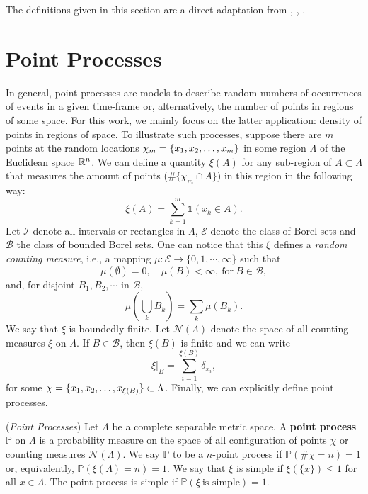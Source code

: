 The definitions given in this section are a direct adaptation from \cite{JOHANSSON20061}, \cite{SERFOZO19901}, \cite{ManuelaGirottiPhD}. 

\section{Point Processes}

 In general, point processes are models to describe random numbers of occurrences of events in a given time-frame or, alternatively, the number of points in regions of some space. For this work, we mainly focus on the latter application: density of points in regions of space. To illustrate such processes, suppose there are $m$ points at the random locations $\chi_m = \{x_1, x_2, \dots, x_m\}$ in some region $\Lambda$ of the Euclidean space $\mathbb{R}^n$. We can define a quantity $\xi(A)$ for any sub-region of $A \subset \Lambda$ that measures the amount of points ($\#\{\chi_m \cap A\}$) in this region in the following way:
\begin{equation}
	\xi(A) = \sum_{k=1}^{m} \mathbb{1}(x_k \in A).
\end{equation}
Let $\mathcal{I}$ denote all intervals or rectangles in $\Lambda$, $\mathcal{E}$ denote the class of Borel sets and $\mathcal{B}$ the class of bounded Borel sets. One can notice that this $\xi$ defines a \textit{random counting measure}, i.e., a mapping $\mu: \mathcal{E} \rightarrow \{0,1,\cdots, \infty\}$ such that 
\begin{equation}
	\mu(\emptyset) = 0, \quad \mu(B) < \infty, \ \text{for} \ B \in \mathcal{B},
\end{equation} 
and, for disjoint $B_1, B_2, \cdots$ in $\mathcal{B},$
\begin{equation}
	\mu\left( \bigcup_k B_k \right) = \sum_k \mu(B_k).
\end{equation} 
We say that $\xi$ is boundedly finite. Let $\mathcal{N}(\Lambda)$ denote the space of all counting measures $\xi$ on $\Lambda$. If $B \in \mathcal{B}$, then $\xi(B)$ is finite and we can write
\begin{equation}
	\xi|_B = \sum_{i=1}^{\xi(B)} \delta_{x_i},
\end{equation}
for some $\chi = \{x_1, x_2, \dots, x_{\xi(B)}\} \subset \Lambda$. Finally, we can explicitly define point processes.

\begin{definition} (\textit{Point Processes})
	Let $\Lambda$ be a complete separable metric space. A \textbf{point process} $\mathbb{P}$ on $\Lambda$ is a probability measure on the space of all configuration of points $\chi$ or counting measures $\mathcal{N}(\Lambda)$. We say $\mathbb{P}$ to be a $n$-point process if $\mathbb{P}(\# \chi = n) = 1$ or, equivalently, $\mathbb{P}(\xi(\Lambda) = n)  = 1$. We say that $\xi$ is simple if $\xi(\{x\}) \leq 1$ for all $x \in \Lambda$. The point process is simple if $\mathbb{P}( \xi \ \text{is simple}) = 1$.
\end{definition}

